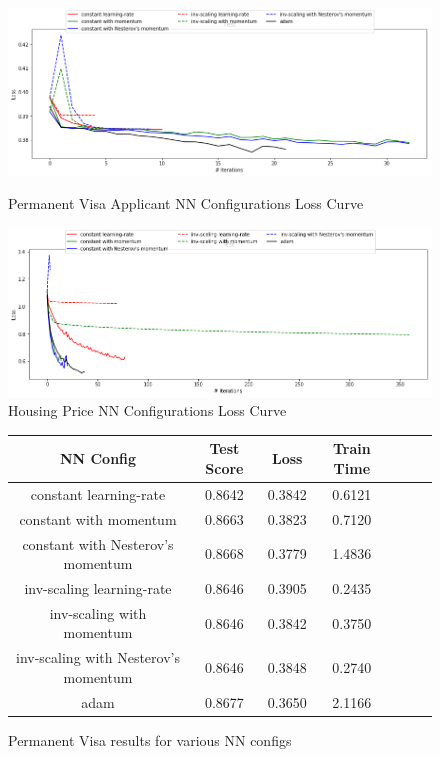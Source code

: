 \documentclass[h]{article}
\begin{document}
\begin{figure}[H]
      \includegraphics[width=1\textwidth,keepaspectratio]{1_nn_together.png} 
      \caption*{Permanent Visa Applicant NN Configurations Loss Curve} 
   \endminipage\hfill
      \includegraphics[width=1\textwidth,keepaspectratio]{2_nn_together.png} 
      \caption*{Housing Price NN Configurations Loss Curve} 
   \endminipage\hfill
\end{figure}

\begin{figure}[H]
\begin{tabular}{ | c | c  | c | c | c | c | c |} 
\hline
\textbf{NN Config} & \textbf{Test Score} & \textbf{Loss} & \textbf{Train Time}   \\ 
\hline
constant learning-rate & 0.8642 & 0.3842 & 0.6121 \\ \hline
constant with momentum & 0.8663 & 0.3823 & 0.7120 \\ \hline
constant with Nesterov's momentum & 0.8668 & 0.3779 & 1.4836 \\ \hline
inv-scaling learning-rate & 0.8646 & 0.3905 & 0.2435 \\ \hline
inv-scaling with momentum & 0.8646 & 0.3842 & 0.3750 \\ \hline
inv-scaling with Nesterov's momentum & 0.8646 & 0.3848 & 0.2740 \\ \hline
adam & 0.8677 & 0.3650 & 2.1166 \\ \hline
\end{tabular}
\caption*{Permanent Visa results for various NN configs}
\endminipage\hfill
\end{figure}
\end{document}
